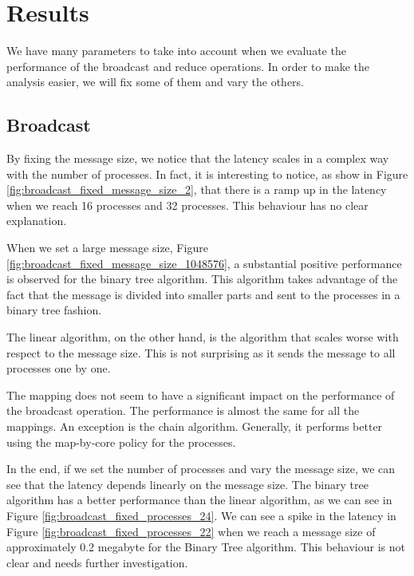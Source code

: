 \section{Results}

We have many parameters to take into account when we evaluate the performance of the broadcast and reduce operations. In order to make the analysis easier, we will fix some of them and vary the others.

\subsection{Broadcast}

By fixing the message size, we notice that the latency scales in a complex way with the number of processes. In fact, it is interesting to notice, as show in Figure \ref{fig:broadcast_fixed_message_size_2}, that there is a ramp up in the latency when we reach 16 processes and 32 processes. This behaviour has no clear explanation.

When we set a large message size, Figure \ref{fig:broadcast_fixed_message_size_1048576}, a substantial positive performance is observed for the binary tree algorithm. This algorithm takes advantage of the fact that the message is divided into smaller parts and sent to the processes in a binary tree fashion.

The linear algorithm, on the other hand, is the algorithm that scales worse with respect to the message size. This is not surprising as it sends the message to all processes one by one.

The mapping does not seem to have a significant impact on the performance of the broadcast operation. The performance is almost the same for all the mappings. An exception is the chain algorithm. Generally, it performs better using the map-by-core policy for the processes.

In the end, if we set the number of processes and vary the message size, we can see that the latency depends linearly on the message size. The binary tree algorithm has a better performance than the linear algorithm, as we can see in Figure \ref{fig:broadcast_fixed_processes_24}. We can see a spike in the latency in Figure \ref{fig:broadcast_fixed_processes_22} when we reach a message size of approximately 0.2 megabyte for the Binary Tree algorithm. This behaviour is not clear and needs further investigation.



